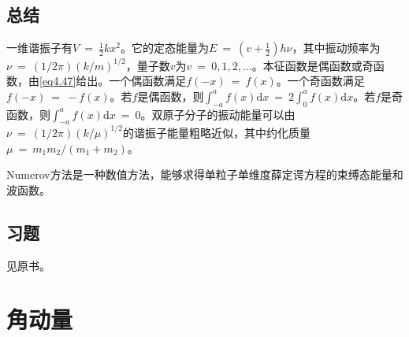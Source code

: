 \documentclass[12pt,a4paper,openany]{ctexbook}
\newcommand{\dd}[1]{\mathrm{d} #1}
\begin{document}
\section*{总结}
\begin{flushleft}
    \setlength{\parindent}{2em}
一维谐振子有$V\ =\ \frac{1}{2}kx^2$。它的定态能量为$E\ =\ (v+\frac{1}{2})h\nu$，其中振动频率为$\nu\ =\ (1/2\pi)(k/m)^{1/2}$，量子数$v$为$v\ =\ 0,1,2,\dots$。本征函数是偶函数或奇函数，由\eqref{eq4.47}给出。一个偶函数满足$f(-x)\ =\ f(x)$。一个奇函数满足$f(-x)\ =\ -f(x)$。若$f$是偶函数，则$\int_{-a}^{a}f(x)\dd x\ =\ 2\int_0^af(x)\dd x$。若$f$是奇函数，则$\int_{-a}^{a}f(x)\dd x\ =\ 0$。双原子分子的振动能量可以由$\nu\ =\ (1/2\pi)(k/\mu)^{1/2}$的谐振子能量粗略近似，其中约化质量$\mu\ =\ m_1m_2/(m_1+m_2)$。

Numerov方法是一种数值方法，能够求得单粒子单维度薛定谔方程的束缚态能量和波函数。
\end{flushleft}
\section*{习题}
见原书。

\chapter{角动量}
\end{document}
